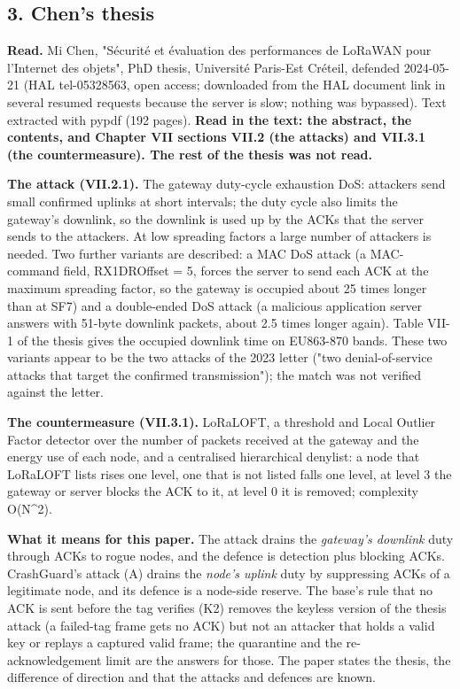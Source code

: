\subsection*{3. Chen's thesis}

\textbf{Read.} Mi Chen, "S\'ecurit\'e et \'evaluation des performances de LoRaWAN pour l'Internet des objets", PhD thesis, Universit\'e Paris-Est Cr\'eteil, defended 2024-05-21 (HAL tel-05328563, open access; downloaded from the HAL document link in several resumed requests because the server is slow; nothing was bypassed). Text extracted with pypdf (192 pages). \textbf{Read in the text: the abstract, the contents, and Chapter VII sections VII.2 (the attacks) and VII.3.1 (the countermeasure). The rest of the thesis was not read.}

\textbf{The attack (VII.2.1).} The gateway duty-cycle exhaustion DoS: attackers send small confirmed uplinks at short intervals; the duty cycle also limits the gateway's downlink, so the downlink is used up by the ACKs that the server sends to the attackers. At low spreading factors a large number of attackers is needed. Two further variants are described: a MAC DoS attack (a MAC-command field, RX1DROffset = 5, forces the server to send each ACK at the maximum spreading factor, so the gateway is occupied about 25 times longer than at SF7) and a double-ended DoS attack (a malicious application server answers with 51-byte downlink packets, about 2.5 times longer again). Table VII-1 of the thesis gives the occupied downlink time on EU863-870 bands. These two variants appear to be the two attacks of the 2023 letter ("two denial-of-service attacks that target the confirmed transmission"); the match was not verified against the letter.

\textbf{The countermeasure (VII.3.1).} LoRaLOFT, a threshold and Local Outlier Factor detector over the number of packets received at the gateway and the energy use of each node, and a centralised hierarchical denylist: a node that LoRaLOFT lists rises one level, one that is not listed falls one level, at level 3 the gateway or server blocks the ACK to it, at level 0 it is removed; complexity O(N\textasciicircum{}2).

\textbf{What it means for this paper.} The attack drains the \emph{gateway's downlink} duty through ACKs to rogue nodes, and the defence is detection plus blocking ACKs. CrashGuard's attack (A) drains the \emph{node's uplink} duty by suppressing ACKs of a legitimate node, and its defence is a node-side reserve. The base's rule that no ACK is sent before the tag verifies (K2) removes the keyless version of the thesis attack (a failed-tag frame gets no ACK) but not an attacker that holds a valid key or replays a captured valid frame; the quarantine and the re-acknowledgement limit are the answers for those. The paper states the thesis, the difference of direction and that the attacks and defences are known.

